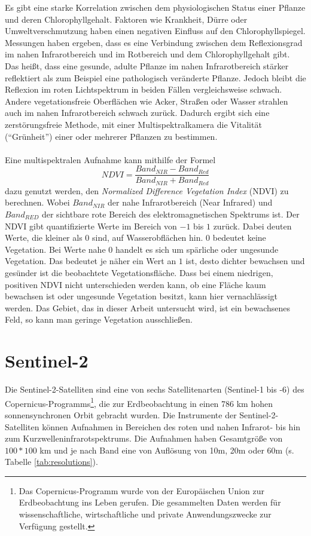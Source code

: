 Es gibt eine starke Korrelation zwischen dem physiologischen Status einer Pflanze und deren Chlorophyllgehalt. Faktoren wie Krankheit, Dürre oder Umweltverschmutzung haben einen negativen Einfluss auf den Chlorophyllspiegel.\cite{ref:hendry} Messungen haben ergeben, dass es eine Verbindung zwischen dem Reflexionsgrad im nahen Infrarotbereich und im Rotbereich und dem Chlorophyllgehalt gibt. Das heißt, dass eine gesunde, adulte Pflanze im nahen Infrarotbereich stärker reflektiert als zum Beispiel eine pathologisch veränderte Pflanze. Jedoch bleibt die Reflexion im roten Lichtspektrum in beiden Fällen vergleichsweise schwach. Andere vegetationsfreie Oberflächen wie Acker, Straßen oder Wasser strahlen auch im nahen Infrarotbereich schwach zurück. Dadurch ergibt sich eine zerstörungsfreie Methode, mit einer Multispektralkamera die Vitalität ("`Grünheit"') einer oder mehrerer Pflanzen zu bestimmen.\cite{ref:anatoly} \\\\
Eine multispektralen Aufnahme kann mithilfe der Formel 
\begin{equation}\label{equation:ndvi}
	NDVI = \frac{Band_{NIR} - Band_{Red}} {Band_{NIR} + Band_{Red}}
\end{equation}
dazu genutzt werden, den \textit{Normalized Difference Vegetation Index} (NDVI) zu berechnen. Wobei $Band_{NIR}$ der nahe Infrarotbereich (Near Infrared) und $Band_{RED}$ der sichtbare rote Bereich des elektromagnetischen Spektrums ist. Der NDVI gibt quantifizierte Werte im Bereich von $-1$ bis $1$ zurück. Dabei deuten Werte, die kleiner als $0$ sind, auf Wasserobflächen hin. $0$ bedeutet keine Vegetation. Bei Werte nahe $0$ handelt es sich um spärliche oder ungesunde Vegetation. Das bedeutet je näher ein Wert an $1$ ist, desto dichter bewachsen und gesünder ist die beobachtete Vegetationsfläche.\cite{ref:nasa} Dass bei einem niedrigen, positiven NDVI nicht unterschieden werden kann, ob eine Fläche kaum bewachsen ist oder ungesunde Vegetation besitzt, kann hier vernachlässigt werden. Das Gebiet, das in dieser Arbeit untersucht wird, ist ein bewachsenes Feld, so kann man geringe Vegetation ausschließen. 

\section{Sentinel-2}\label{sec:sentinel2}

Die Sentinel-2-Satelliten sind eine von sechs Satellitenarten (Sentinel-1 bis -6) des Copernicus-Programms\footnote{Das Copernicus-Programm wurde von der Europäischen Union zur Erdbeobachtung ins Leben gerufen. Die gesammelten Daten werden für wissenschaftliche, wirtschaftliche und private Anwendungszwecke zur Verfügung gestellt.\cite{ref:copernicus}}, die zur Erdbeobachtung in einen 786 km hohen sonnensynchronen Orbit gebracht wurden. Die Instrumente der Sentinel-2-Satelliten können Aufnahmen in Bereichen des roten und nahen Infrarot- bis hin zum Kurzwelleninfrarotspektrums. Die Aufnahmen haben Gesamtgröße von $100*100$ km und je nach Band eine von Auflösung von 10m, 20m oder 60m (s. Tabelle \ref{tab:resolutions}).

